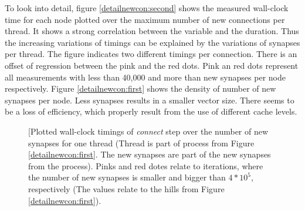 To look into detail, figure \ref{detailnewcon:second} shows the measured wall-clock time for each node
plotted over the maximum number of new connections per thread. It shows a strong correlation between the variable and
the duration. Thus the increasing variations of timings can be explained by the variations of synapses per thread.
The figure indicates two different timings per connection. There is an offset of regression between the pink
and the red dots. Pink an red dots represent all measurements with less than 40,000 and more than new synapses per
node respectively. Figure \ref{detailnewcon:first} shows the density of number of new synapses per node.
Less synapses results in a smaller vector size. There seems to be a loss of efficiency, which properly result from
the use of different cache levels. 

\begin{figure}[ht!]
     \begin{center}
        \subfigure[Plotted wall-clock timings of \emph{connect} step over the number of new synapses for one thread
        			(Thread is part of process from Figure \ref{detailnewcon:first}. The new synapses are part of the new synapses from the process).
        			Pinks and red dotes relate to iterations, where the number of new synapses is smaller and bigger than $4*10^5$,
        			respectively (The values relate to the hills from Figure \ref{detailnewcon:first}). 

\end{center}
\end{figure}
